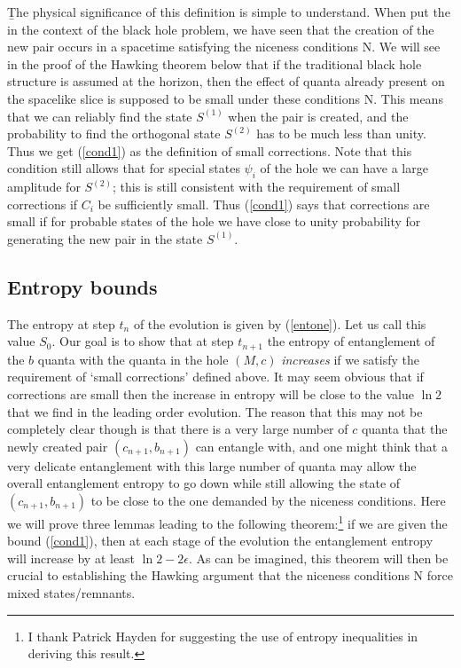 \documentclass[12pt]{article}
\begin{document}
\b

The physical significance of this definition is simple to understand. When put the  in the context of the black hole problem, we have seen that the creation of the new pair  occurs in a spacetime satisfying the niceness conditions N. We will see in the proof of the Hawking theorem below  that if the traditional black hole structure is assumed at the horizon, then the effect of quanta already present on the spacelike slice is supposed to be small under these conditions N. This means that we can reliably find the state $S^{(1)}$ when the pair is created, and the probability to find the orthogonal state $S^{(2)}$ has to be much less than unity. Thus we get (\ref{cond1}) as the definition of small corrections. Note that this condition still allows that for special states $\psi_i$ of the hole we can have a large amplitude for $S^{(2)}$; this is still consistent with the requirement of small corrections if   $C_i$ be sufficiently small. Thus (\ref{cond1}) says that corrections are small if for probable states of the hole we have close to unity probability for generating the new pair in the state $S^{(1)}$.


\subsection{Entropy bounds}

The entropy at step $t_n$ of the evolution is given by (\ref{entone}). Let us call this value $S_0$. Our goal is to show that at step $t_{n+1}$ the entropy of entanglement of the $b$ quanta with the quanta in the hole $(M, c)$ {\it increases}
if we satisfy the requirement of `small corrections'  defined above. It may seem obvious that if corrections are small then the increase in entropy will be close to the value $\ln 2$ that we find in the leading order evolution. The reason that this may not be completely clear though is that there is a very large number of $c$ quanta that the newly created pair $(c_{n+1}, b_{n+1})$ can entangle with, and one might think that a very delicate entanglement with this large number of quanta may allow the overall entanglement entropy to go down while still allowing the state of $(c_{n+1}, b_{n+1})$ to be close to the one demanded by the niceness conditions. Here we will prove three lemmas leading to the following theorem:\footnote{I thank Patrick Hayden for suggesting the use of entropy inequalities in deriving this result.}  if we are given the bound (\ref{cond1}), then at each stage of the evolution the entanglement entropy will increase by  at least $\ln 2-2\epsilon$. As can be imagined, this theorem will then be crucial to establishing the Hawking argument that the niceness conditions N force mixed states/remnants.
\end{document}
